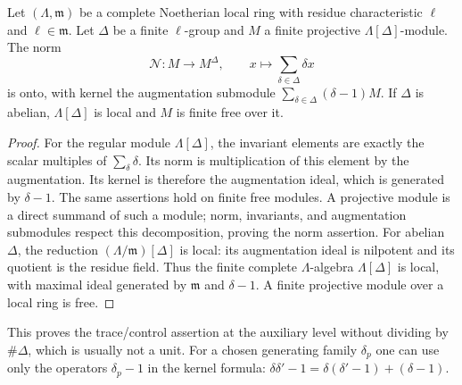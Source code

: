 \begin{srlemma}
\label{lem:projective-norm-control}
Let $(\Lambda,\mathfrak m)$ be a complete Noetherian local
ring with residue characteristic $\ell$ and
$\ell\in\mathfrak m$.  Let $\Delta$ be a finite $\ell$-group
and $M$ a finite projective $\Lambda[\Delta]$-module.
The norm
\[
       \mathcal N:M\longrightarrow M^\Delta,\qquad
                         x\longmapsto\sum_{\delta\in\Delta}\delta x
\]
is onto, with kernel the augmentation submodule
$\sum_{\delta\in\Delta}(\delta-1)M$.
If $\Delta$ is abelian, $\Lambda[\Delta]$ is local and
$M$ is finite free over it.
\end{srlemma}
\begin{proof}
For the regular module $\Lambda[\Delta]$, the invariant
elements are exactly the scalar multiples of
$\sum_\delta\delta$.  Its norm is multiplication of this
element by the augmentation.  Its kernel is therefore the
augmentation ideal, which is generated by $\delta-1$.
The same assertions hold on finite free modules.
A projective module is a direct summand of such a module;
norm, invariants, and augmentation submodules respect this
decomposition, proving the norm assertion.
For abelian $\Delta$, the reduction
$(\Lambda/\mathfrak m)[\Delta]$ is local:
its augmentation ideal is nilpotent and its quotient is the
residue field.  Thus the finite complete $\Lambda$-algebra
$\Lambda[\Delta]$ is local, with maximal ideal generated by
$\mathfrak m$ and $\delta-1$.
A finite projective module over a local ring is free.
\end{proof}

This proves the trace/control assertion at the auxiliary
level without dividing by $\#\Delta$, which is usually not a
unit.  For a chosen generating family $\delta_p$ one can use
only the operators $\delta_p-1$ in the kernel formula:
$\delta\delta'-1=\delta(\delta'-1)+(\delta-1)$.

